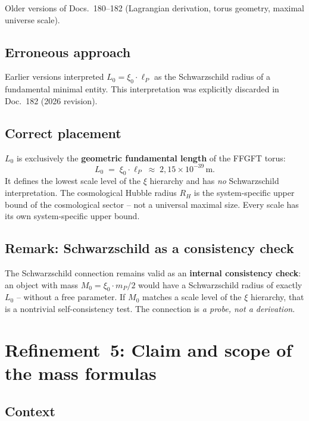 Older versions of Docs.~180--182 (Lagrangian derivation, torus geometry,
maximal universe scale).

\subsection*{Erroneous approach}

Earlier versions interpreted $L_0 = \xi_0 \cdot \ell_P$ as the Schwarzschild
radius of a fundamental minimal entity. This interpretation was explicitly
discarded in Doc.~182 (2026 revision).

\subsection*{Correct placement}

$L_0$ is exclusively the \textbf{geometric fundamental length} of the FFGFT
torus:
\begin{equation}
  L_0 \;=\; \xi_0 \cdot \ell_P \;\approx\; 2{,}15 \times 10^{-39}\,\text{m}.
  \tag{190.10}
\end{equation}
It defines the lowest scale level of the $\xi$ hierarchy and has \emph{no}
Schwarzschild interpretation. The cosmological Hubble radius $R_H$ is the
system-specific upper bound of the cosmological sector -- not a universal
maximal size. Every scale has its own system-specific upper bound.

\subsection*{Remark: Schwarzschild as a consistency check}

The Schwarzschild connection remains valid as an \textbf{internal consistency
check}: an object with mass $M_0 = \xi_0 \cdot m_P / 2$ would have a
Schwarzschild radius of exactly $L_0$ -- without a free parameter. If $M_0$
matches a scale level of the $\xi$ hierarchy, that is a nontrivial
self-consistency test. The connection is \emph{a probe, not a derivation}.

\section{Refinement~5: Claim and scope of the mass formulas}

\subsection*{Context}

